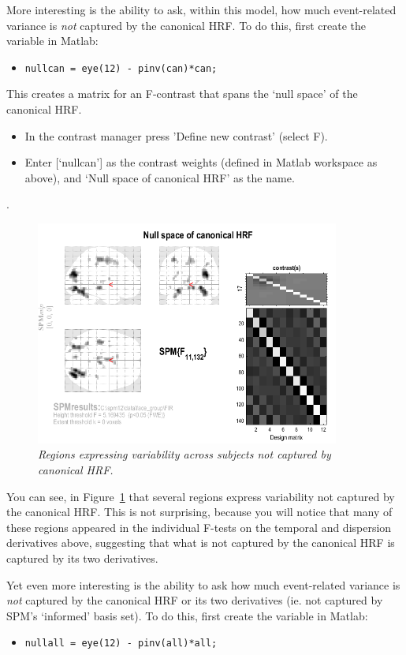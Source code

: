 \documentclass[a4paper,titlepage]{book}
\newcommand{\bi}{\begin{itemize}}
\newcommand{\ei}{\end{itemize}}
\begin{document}
More interesting is the ability to ask, within this model, how much event-related variance is {\em not} captured by the canonical HRF. To do this, first create the variable in Matlab:
\bi
\item{\verb!nullcan = eye(12) - pinv(can)*can;!}
\ei

This creates a matrix for an F-contrast that spans the `null space' of the canonical HRF.
\bi
\item{In the contrast manager press 'Define new contrast' (select F).}
\item{Enter [`nullcan'] as the contrast weights (defined in Matlab workspace as above), and `Null space of canonical HRF' as the name.}
\ei
\cite{daniel_hbf2}.
\begin{figure}
\begin{center}
\includegraphics[width=100mm]{faces_group/nullcan}
\caption{\em Regions expressing variability across subjects not captured by canonical HRF. \label{nullcan}}
\end{center}
\end{figure}
You can see, in Figure~\ref{nullcan} that several regions express variability not captured by the canonical HRF. This is not surprising, because you will notice that many of these regions appeared in the individual F-tests on the temporal and dispersion derivatives above, suggesting that what is not captured by the canonical HRF is captured by its two derivatives.

Yet even more interesting is the ability to ask how much event-related variance is {\em not} captured by the canonical HRF or its two derivatives (ie. not captured by SPM's `informed' basis set). To do this, first create the variable in Matlab: 

\bi
\item{\verb!nullall = eye(12) - pinv(all)*all;!}
\ei
\end{document}
